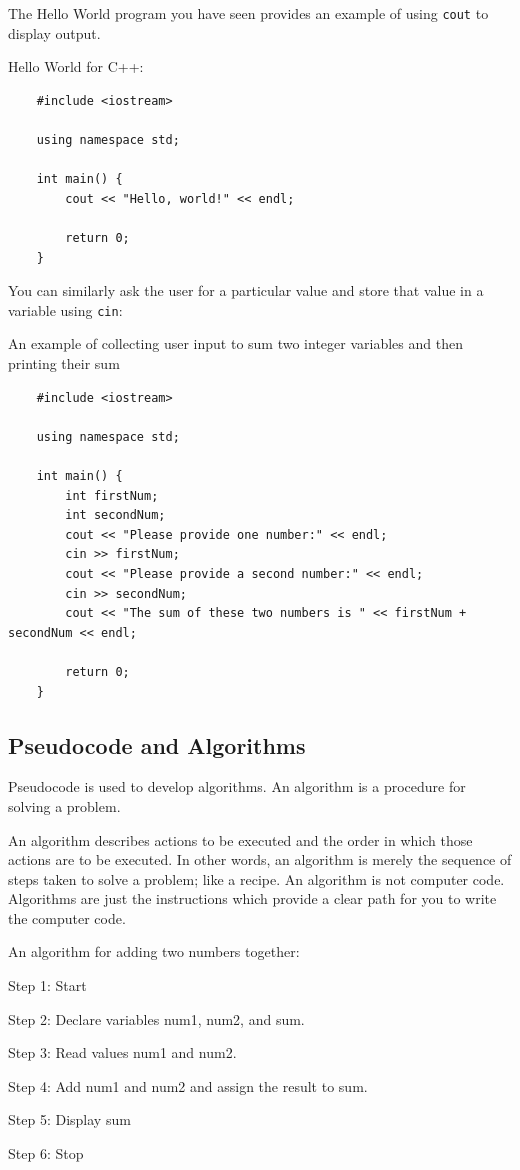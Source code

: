 The Hello World program you have seen provides an example of using \texttt{cout} to display output.

\begin{example}
Hello World for C++:
\begin{verbatim}
    #include <iostream>

    using namespace std;

    int main() {
        cout << "Hello, world!" << endl;
        
        return 0;
    }
\end{verbatim}

\end{example}

You can similarly ask the user for a particular value and store that value in a variable using \texttt{cin}:

\begin{example}
An example of collecting user input to sum two integer variables and then printing their sum
\begin{verbatim}
    #include <iostream>

    using namespace std;

    int main() {
        int firstNum;
        int secondNum;
        cout << "Please provide one number:" << endl;
        cin >> firstNum;
        cout << "Please provide a second number:" << endl;
        cin >> secondNum;
        cout << "The sum of these two numbers is " << firstNum + secondNum << endl;

        return 0;
    }
\end{verbatim}

\end{example}

\subsection{Pseudocode and Algorithms}

Pseudocode is used to develop algorithms. An algorithm is a procedure for solving a problem.

An algorithm describes actions to be executed and the order in which those actions are to be executed. In other words, an algorithm is merely the sequence of steps taken to solve a problem; like a recipe. An algorithm is not computer code. Algorithms are just the instructions which provide a clear path for you to write the computer code.

\begin{example}
    An algorithm for adding two numbers together:

Step 1: Start

Step 2: Declare variables num1, num2, and sum.

Step 3: Read values num1 and num2.

Step 4: Add num1 and num2 and assign the result to sum.

Step 5: Display sum

Step 6: Stop
\end{example}

